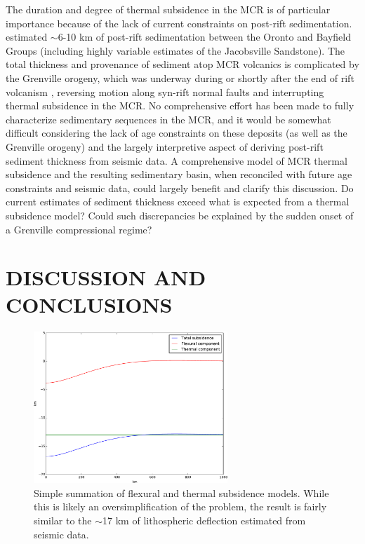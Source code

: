 \documentclass[12pt,letterpaper]{article}
\begin{document}
The duration and degree of thermal subsidence in the MCR is of particular importance because of the lack of current constraints on post-rift sedimentation. \cite{Ojakangas2001a} estimated $\sim$6-10 km of post-rift sedimentation between the Oronto and Bayfield Groups (including highly variable estimates of the Jacobsville Sandstone). The total thickness and provenance of sediment atop MCR volcanics is complicated by the Grenville orogeny, which was underway during or shortly after the end of rift volcanism \citep{Halls2015a}, reversing motion along syn-rift normal faults and interrupting thermal subsidence in the MCR. No comprehensive effort has been made to fully characterize sedimentary sequences in the MCR, and it would be somewhat difficult considering the lack of age constraints on these deposits (as well as the Grenville orogeny) and the largely interpretive aspect of deriving post-rift sediment thickness from seismic data. A comprehensive model of MCR thermal subsidence and the resulting sedimentary basin, when reconciled with future age constraints and seismic data, could largely benefit and clarify this discussion. Do current estimates of sediment thickness exceed what is expected from a thermal subsidence model? Could such discrepancies be explained by the sudden onset of a Grenville compressional regime?

\section{DISCUSSION AND CONCLUSIONS}
\begin{figure}
\noindent\includegraphics[width=0.65\textwidth]{figures/combined_sub.pdf}
\caption{\footnotesize{Simple summation of flexural and thermal subsidence models. While this is likely an oversimplification of the problem, the result is fairly similar to the $\sim$17 km of lithospheric deflection estimated from seismic data.}}
\label{fig:combined_sub}
\end{figure}
\end{document}
